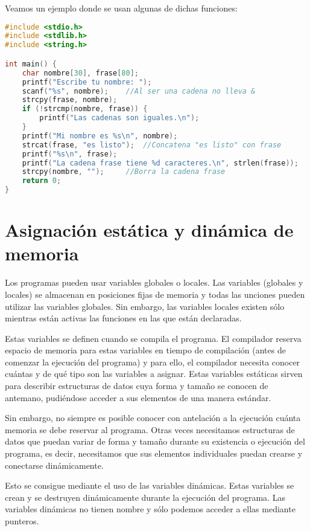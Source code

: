 Veamos un ejemplo donde se usan algunas de dichas funciones:
\begin{Ejemplo}
\begin{lstlisting}[language=C]
#include <stdio.h>
#include <stdlib.h>
#include <string.h>

int main() {
    char nombre[30], frase[80];
    printf("Escribe tu nombre: ");
    scanf("%s", nombre);	//Al ser una cadena no lleva &
    strcpy(frase, nombre);
    if (!strcmp(nombre, frase)) {
        printf("Las cadenas son iguales.\n");
    }
    printf("Mi nombre es %s\n", nombre);
    strcat(frase, "es listo");	//Concatena "es listo" con frase
    printf("%s\n", frase);
    printf("La cadena frase tiene %d caracteres.\n", strlen(frase));
    strcpy(nombre, "");		//Borra la cadena frase
    return 0;
}
\end{lstlisting}
\end{Ejemplo}

\section{Asignación estática y dinámica de memoria}
Los programas pueden usar variables globales o locales. Las variables (globales y locales) se almacenan en posiciones fijas de memoria y todas las unciones pueden utilizar las variables globales. Sin embargo, las variables locales existen sólo mientras están activas las funciones en las que están declaradas.

Estas variables se definen cuando se compila el programa. El compilador reserva espacio de memoria para estas variables en tiempo de compilación (antes de comenzar la ejecución del programa) y para ello, el compilador necesita conocer cuántas y de qué tipo son las variables a asignar. Estas variables estáticas sirven para describir estructuras de datos cuya forma y tamaño se conocen de antemano, pudiéndose acceder a sus elementos de una manera estándar.

Sin embargo, no siempre es posible conocer con antelación a la ejecución cuánta memoria se debe reservar al programa. Otras veces necesitamos estructuras de datos que puedan variar de forma y tamaño durante su existencia o ejecución del programa, es decir, necesitamos que sus elementos individuales puedan crearse y conectarse dinámicamente.

Esto se consigue mediante el uso de las variables dinámicas. Estas variables se crean y se destruyen dinámicamente durante la ejecución del programa. Las variables dinámicas no tienen nombre y sólo podemos acceder a ellas mediante punteros.

